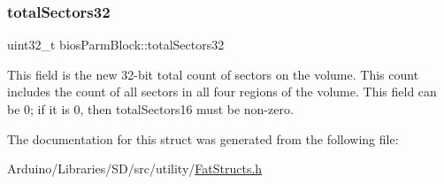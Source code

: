 \subsubsection{\texorpdfstring{total\+Sectors32}{totalSectors32}}
{\footnotesize\ttfamily uint32\+\_\+t bios\+Parm\+Block\+::total\+Sectors32}

This field is the new 32-\/bit total count of sectors on the volume. This count includes the count of all sectors in all four regions of the volume. This field can be 0; if it is 0, then total\+Sectors16 must be non-\/zero. 

The documentation for this struct was generated from the following file\+:\begin{DoxyCompactItemize}
\item 
Arduino/\+Libraries/\+S\+D/src/utility/\hyperlink{_fat_structs_8h}{Fat\+Structs.\+h}\end{DoxyCompactItemize}
